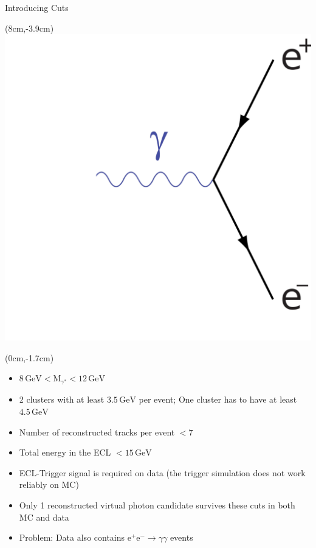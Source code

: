 \documentclass[8pt]{beamer}
\begin{document}
\begin{frame}{Introducing Cuts}
	
	\begin{textblock*}{3cm}(8cm,-3.9cm)
		\includegraphics[width=\textwidth]{VBilder/bha2}
	\end{textblock*}
	
	
	\begin{textblock*}{11cm}(0cm,-1.7cm)
	\begin{itemize}
		\item<3-> $8\,\textrm{GeV} < \textrm{M}_{\gamma^*} < 12\,\textrm{GeV}$
		\item<3-> 2 clusters with at least $3.5\,\textrm{GeV}$ per event; One cluster has to have at least $4.5\,\textrm{GeV}$
		\item<3-> Number of reconstructed tracks per event $< 7$
		\item<3-> Total energy in the ECL $< 15\,\textrm{GeV}$
		\item<3-> ECL-Trigger signal is required on data (the trigger simulation does not work reliably on MC)
		\item<4-> Only 1 reconstructed virtual photon candidate survives these cuts in both MC and data 
		\item<5-> Problem: Data also contains $\textrm{e}^+ \textrm{e}^- \rightarrow \gamma \gamma$ events
	\end{itemize}


\end{textblock*}
\end{frame}
\end{document}

